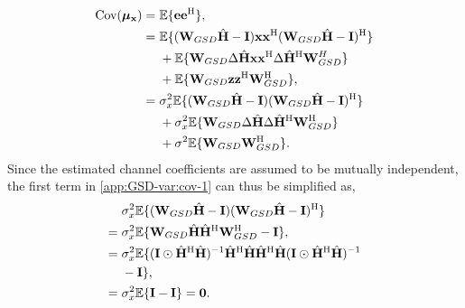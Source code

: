 \documentclass[journal]{IEEEtran}
\newcommand{\HT}{^{\mathrm{H}}} %
\begin{document}
\begin{equation}
\begin{split}
\text{Cov}(\bm \mu_{\mathbf x}) = \hspace{0.3em} & \mathbb{E}\{\mathbf e \mathbf e\HT\}, \\
=\hspace{0.3em} & \mathbb{E}\{({\mathbf W}_{GSD}\hat{\mathbf H} - \mathbf I)\mathbf x \mathbf x\HT ({\mathbf W}_{GSD}\hat{\mathbf H} - \mathbf I)\HT\} \\
& + \mathbb{E}\{ {\mathbf W}_{GSD}\Delta \hat{\mathbf H} \mathbf x \mathbf x\HT \Delta \hat{\mathbf H}\HT{\mathbf W}_{GSD}^H\} \\ 
& + \mathbb{E}\{ {\mathbf W}_{GSD}\mathbf z\mathbf z\HT{\mathbf W}_{GSD}\HT \}, \\
=\hspace{0.3em} & \sigma_x^2\mathbb{E}\{({\mathbf W}_{GSD}\hat{\mathbf H} - \mathbf I)({\mathbf W}_{GSD}\hat{\mathbf H} - \mathbf I)\HT\} \\
& + \sigma_x^2\mathbb{E}\{{\mathbf W}_{GSD} \Delta \hat{\mathbf H} \Delta \hat{\mathbf H}\HT{\mathbf W}_{GSD}\HT\} \\ 
& + \sigma^2\mathbb{E}\{ {\mathbf W}_{GSD}{\mathbf W}_{GSD}\HT \}. \\
\end{split}
\label{app:GSD-var:cov-1}
\end{equation}
Since the estimated channel coefficients are assumed to be mutually independent, the first term in \eqref{app:GSD-var:cov-1} can thus be simplified as,
\begin{equation}
\begin{split}
& \sigma_x^2\mathbb{E}\{({\mathbf W}_{GSD}\hat{\mathbf H} - \mathbf I)({\mathbf W}_{GSD}\hat{\mathbf H} - \mathbf I)\HT\}\\
=\hspace{0.3em} & \sigma_x^2\mathbb{E}\{{\mathbf W}_{GSD}\hat{\mathbf H}\hat{\mathbf H}\HT{\mathbf W}_{GSD}\HT - \mathbf I\}, \\
=\hspace{0.3em} & \sigma_x^2\mathbb{E}\{ (\mathbf I\odot\hat{\mathbf H}\HT \hat{\mathbf H})^{-1}\hat{\mathbf H}\HT \hat{\mathbf H}\hat{\mathbf H}\HT \hat{\mathbf H} (\mathbf I\odot\hat{\mathbf H}\HT \hat{\mathbf H})^{-1} \\
& - \mathbf I\}, \\
=\hspace{0.3em} & \sigma_x^2\mathbb{E}\{ \mathbf I - \mathbf I\} = \mathbf 0.
\end{split}
\end{equation}
\end{document}
